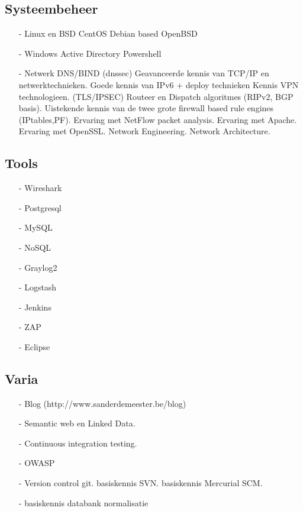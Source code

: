 \documentclass[margin, 10pt]{res} %
\begin{document}
\subsection{Systeembeheer}
\begin{itemize}
\item[-] Linux en BSD
\subitem CentOS
\subitem Debian based
\subitem OpenBSD
\item[-] Windows
\subitem Active Directory
\subitem Powershell
\end{itemize}
\begin{itemize}
\item[-] Netwerk
\subitem DNS/BIND (dnssec)
\subitem Geavanceerde kennis van TCP/IP en netwerktechnieken.
\subitem Goede kennis van IPv6 + deploy technieken
\subitem Kennis VPN technologieen. (TLS/IPSEC)
\subitem Routeer en Dispatch algoritmes (RIPv2, BGP basis).
\subitem Uistekende kennis van de twee grote firewall based rule engines (IPtables,PF).
\subitem Ervaring met NetFlow packet analysis.
\subitem Ervaring met Apache.
\subitem Ervaring met OpenSSL.
\subitem Network Engineering.
\subitem Network Architecture.
\end{itemize}
\newpage
\begin{multicols}{2}
\subsection*{Tools}
\begin{enumerate}
\item[-] Wireshark
\item[-] Postgresql
\item[-] MySQL
\item[-] NoSQL
\item[-] Graylog2
\item[-] Logstash
\item[-] Jenkins
\item[-] ZAP
\item[-] Eclipse
\end{enumerate}
\end{multicols}
\subsection{Varia}
\begin{enumerate}
\item[-] Blog (http://www.sanderdemeester.be/blog)
\item[-] Semantic web en Linked Data.
\item[-] Continuous integration testing.
\item[-] OWASP
\item[-] Version control
\subitem git.
\subitem basiskennis SVN.
\subitem basiskennis Mercurial SCM.
\item[-] basiskennis databank normalisatie
\end{enumerate}
\end{document}
